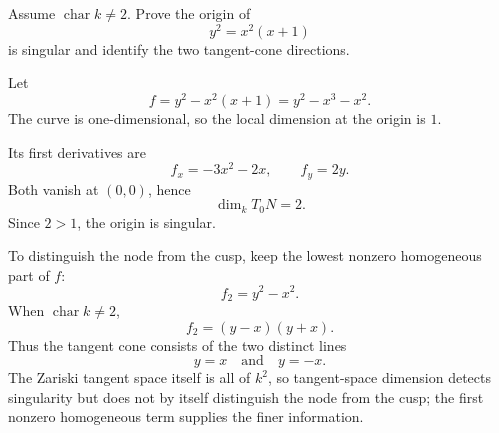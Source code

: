 \begin{problem}\label{prob:vi32-08}
Assume \(\operatorname{char}k\ne2\). Prove the origin of
\[
y^2=x^2(x+1)
\]
is singular and identify the two tangent-cone directions.

\end{problem}

\ifdefined\FullProblemDossiers
\begin{solution}
Let
\[
f=y^2-x^2(x+1)=y^2-x^3-x^2.
\]
The curve is one-dimensional, so the local dimension at the origin is \(1\).

Its first derivatives are
\[
f_x=-3x^2-2x,
\qquad
f_y=2y.
\]
Both vanish at \((0,0)\), hence
\[
\dim_kT_0N=2.
\]
Since \(2>1\), the origin is singular.

To distinguish the node from the cusp, keep the lowest nonzero homogeneous part of \(f\):
\[
f_2=y^2-x^2.
\]
When \(\operatorname{char}k\ne2\),
\[
f_2=(y-x)(y+x).
\]
Thus the tangent cone consists of the two distinct lines
\[
\boxed{y=x\quad\text{and}\quad y=-x}.
\]
The Zariski tangent space itself is all of \(k^2\), so tangent-space dimension detects singularity but does not by
itself distinguish the node from the cusp; the first nonzero homogeneous term supplies the finer information.
\end{solution}
\fi
